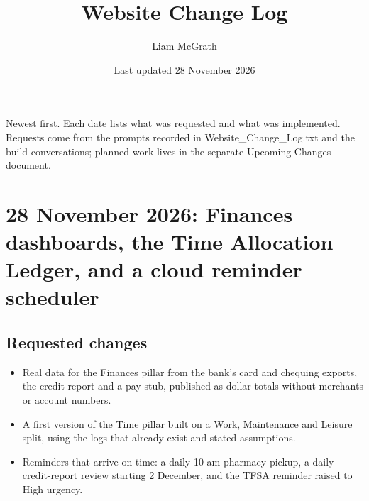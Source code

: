 \documentclass[11pt]{article}
\title{Website Change Log}
\author{Liam McGrath}
\date{Last updated 28 November 2026}
\begin{document}
\maketitle

Newest first. Each date lists what was requested and what was implemented. Requests come from the prompts recorded in Website\_Change\_Log.txt and the build conversations; planned work lives in the separate Upcoming Changes document.

\section{28 November 2026: Finances dashboards, the Time Allocation Ledger, and a cloud reminder scheduler}
\subsection{Requested changes}
\begin{itemize}
\item Real data for the Finances pillar from the bank's card and chequing exports, the credit report and a pay stub, published as dollar totals without merchants or account numbers.
\item A first version of the Time pillar built on a Work, Maintenance and Leisure split, using the logs that already exist and stated assumptions.
\item Reminders that arrive on time: a daily 10 am pharmacy pickup, a daily credit-report review starting 2 December, and the TFSA reminder raised to High urgency.
\end{itemize}
\end{document}
